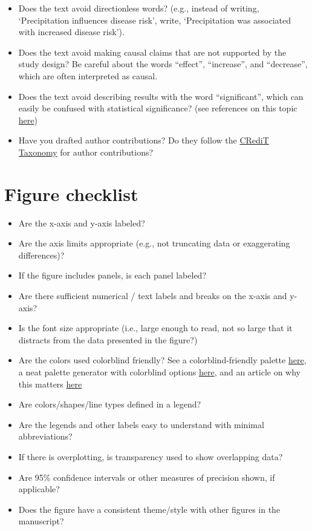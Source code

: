\documentclass[
]{book}
\providecommand{\tightlist}{%
  \setlength{\itemsep}{0pt}\setlength{\parskip}{0pt}}
\begin{document}
\begin{itemize}
\item
  Does the text avoid directionless words? (e.g., instead of writing, `Precipitation influences disease risk', write, `Precipitation was associated with increased disease risk').
\item
  Does the text avoid making causal claims that are not supported by the study design? Be careful about the words ``effect'', ``increase'', and ``decrease'', which are often interpreted as causal.
\item
  Does the text avoid describing results with the word ``significant'', which can easily be confused with statistical significance? (see references on this topic \href{https://journals.lww.com/epidem/Fulltext/2001/05000/The_Value_of_P.2.aspx}{here})
\item
  Have you drafted author contributions? Do they follow the \href{https://journals.plos.org/plosone/s/authorship/?utm_source=plos&utm_medium=blog&utm_campaign=plos-1607-credit\#loc-author-contributions}{CRediT Taxonomy} for author contributions?
\end{itemize}

\section{Figure checklist}\label{figure-checklist}

\begin{itemize}
\tightlist
\item
  Are the x-axis and y-axis labeled?
\item
  Are the axis limits appropriate (e.g., not truncating data or exaggerating differences)?
\item
  If the figure includes panels, is each panel labeled?
\item
  Are there sufficient numerical / text labels and breaks on the x-axis and y-axis?
\item
  Is the font size appropriate (i.e., large enough to read, not so large that it distracts from the data presented in the figure?)
\item
  Are the colors used colorblind friendly? See a colorblind-friendly palette \href{http://www.cookbook-r.com/Graphs/Colors_(ggplot2)/\#a-colorblind-friendly-palette}{here}, a neat palette generator with colorblind options \href{https://medialab.github.io/iwanthue/?utm_source=Nature+Briefing&utm_campaign=2c68711076-briefing-dy-20211006&utm_medium=email&utm_term=0_c9dfd39373-2c68711076-44335685}{here}, and an article on why this matters \href{https://www.nature.com/articles/d41586-021-02696-z}{here}
\item
  Are colors/shapes/line types defined in a legend?
\item
  Are the legends and other labels easy to understand with minimal abbreviations?
\item
  If there is overplotting, is transparency used to show overlapping data?
\item
  Are 95\% confidence intervals or other measures of precision shown, if applicable?
\item
  Does the figure have a consistent theme/style with other figures in the manuscript?
\end{itemize}
\end{document}
